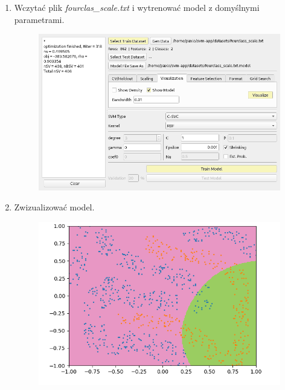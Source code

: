 \documentclass[paper=a4, fontsize=11pt]{scrartcl} %
\numberwithin{equation}{section} %
\numberwithin{figure}{section} %
\begin{document}
    \begin{enumerate}[label={\textbf{Krok \theenumi :}},leftmargin=*]

        \item Wczytać plik \textit{fourclas\_scale.txt} i wytrenować model z domyślnymi
            parametrami.

        \begin{figure}[H]
            \begin{center}
                \includegraphics[scale=2.3]{./img/ex4_st1.png}
            \end{center}
        \end{figure}

        \item Zwizualizować model.

        \begin{figure}[H]
            \begin{center}
                \includegraphics[scale=2.3]{./img/ex4_st2.png}
            \end{center}
        \end{figure}


\end{enumerate}
\end{document}
